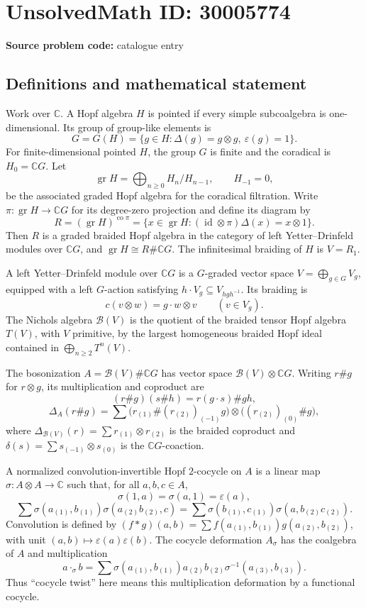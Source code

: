 \documentclass[11pt]{article}
\newcommand{\C}{\mathbb{C}}
\begin{document}
\section*{UnsolvedMath ID: 30005774}
\textbf{Source problem code:} catalogue entry
\subsection{Definitions and mathematical statement}
Work over \(\C\). A Hopf algebra \(H\) is pointed if every simple subcoalgebra is one-dimensional. Its group of group-like elements is
\[
G=G(H)=\{g\in H:\Delta(g)=g\otimes g,\ \varepsilon(g)=1\}.
\]
For finite-dimensional pointed \(H\), the group \(G\) is finite and the coradical is \(H_0=\C G\). Let
\[
\operatorname{gr}H=\bigoplus_{n\geq0}H_n/H_{n-1},\qquad H_{-1}=0,
\]
be the associated graded Hopf algebra for the coradical filtration. Write \(\pi:\operatorname{gr}H\to\C G\) for its degree-zero projection and define its diagram by
\[
R=(\operatorname{gr}H)^{\operatorname{co}\pi}
 =\{x\in\operatorname{gr}H:(\operatorname{id}\otimes\pi)\Delta(x)=x\otimes1\}.
\]
Then \(R\) is a graded braided Hopf algebra in the category of left Yetter--Drinfeld modules over \(\C G\), and \(\operatorname{gr}H\cong R\#\C G\). The infinitesimal braiding of \(H\) is \(V=R_1\).

A left Yetter--Drinfeld module over \(\C G\) is a \(G\)-graded vector space \(V=\bigoplus_{g\in G}V_g\), equipped with a left \(G\)-action satisfying \(h\cdot V_g\subseteq V_{hgh^{-1}}\). Its braiding is
\[
c(v\otimes w)=g\cdot w\otimes v\qquad(v\in V_g).
\]
The Nichols algebra \(\mathcal B(V)\) is the quotient of the braided tensor Hopf algebra \(T(V)\), with \(V\) primitive, by the largest homogeneous braided Hopf ideal contained in \(\bigoplus_{n\geq2}T^n(V)\).

The bosonization \(A=\mathcal B(V)\#\C G\) has vector space \(\mathcal B(V)\otimes\C G\). Writing \(r\#g\) for \(r\otimes g\), its multiplication and coproduct are
\[
(r\#g)(s\#h)=r(g\cdot s)\#gh,
\]
\[
\Delta_A(r\#g)=\sum
\bigl(r_{(1)}\#(r_{(2)})_{(-1)}g\bigr)
\otimes\bigl((r_{(2)})_{(0)}\#g\bigr),
\]
where \(\Delta_{\mathcal B(V)}(r)=\sum r_{(1)}\otimes r_{(2)}\) is the braided coproduct and \(\delta(s)=\sum s_{(-1)}\otimes s_{(0)}\) is the \(\C G\)-coaction.

A normalized convolution-invertible Hopf \(2\)-cocycle on \(A\) is a linear map \(\sigma:A\otimes A\to\C\) such that, for all \(a,b,c\in A\),
\[
\sigma(1,a)=\sigma(a,1)=\varepsilon(a),
\]
\[
\sum\sigma(a_{(1)},b_{(1)})\sigma(a_{(2)}b_{(2)},c)
=\sum\sigma(b_{(1)},c_{(1)})\sigma(a,b_{(2)}c_{(2)}).
\]
Convolution is defined by \((f*g)(a,b)=\sum f(a_{(1)},b_{(1)})g(a_{(2)},b_{(2)})\), with unit \((a,b)\mapsto\varepsilon(a)\varepsilon(b)\). The cocycle deformation \(A_\sigma\) has the coalgebra of \(A\) and multiplication
\[
a\cdot_\sigma b=\sum\sigma(a_{(1)},b_{(1)})a_{(2)}b_{(2)}\sigma^{-1}(a_{(3)},b_{(3)}).
\]
Thus ``cocycle twist'' here means this multiplication deformation by a functional cocycle.
\end{document}
